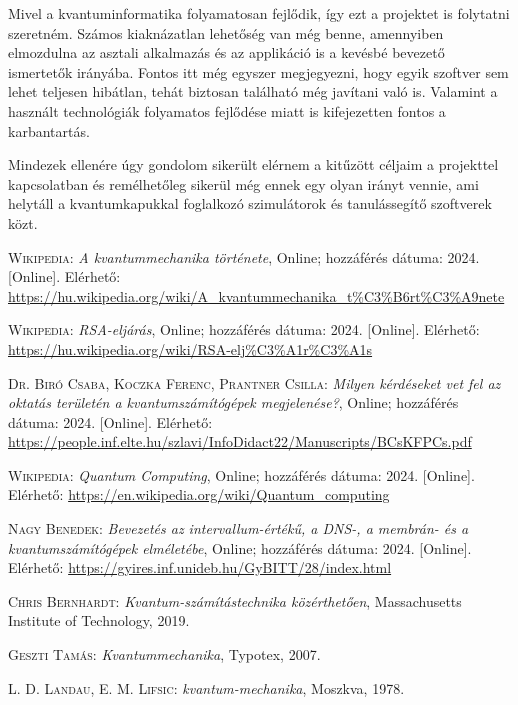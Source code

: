 \documentclass[
]{thesis-ekf}
\theoremstyle{definition}
\theoremstyle{remark}
\begin{document}
Mivel a kvantuminformatika folyamatosan fejlődik, így ezt a projektet is folytatni szeretném. Számos kiaknázatlan lehetőség van még benne, amennyiben elmozdulna az asztali alkalmazás és az applikáció is a kevésbé bevezető ismertetők irányába. Fontos itt még egyszer megjegyezni, hogy egyik szoftver sem lehet teljesen hibátlan, tehát biztosan található még javítani való is. Valamint a használt technológiák folyamatos fejlődése miatt is kifejezetten fontos a karbantartás.

Mindezek ellenére úgy gondolom sikerült elérnem a kitűzött céljaim a projekttel kapcsolatban és remélhetőleg sikerül még ennek egy olyan irányt vennie, ami helytáll a kvantumkapukkal foglalkozó szimulátorok és tanulássegítő szoftverek közt.


\begin{thebibliography}{2}

\textsc{Wikipedia}: \emph{A kvantummechanika története}, Online; hozzáférés dátuma: 2024. [Online]. Elérhető: \url{https://hu.wikipedia.org/wiki/A_kvantummechanika_t%C3%B6rt%C3%A9nete}

\textsc{Wikipedia}: \emph{RSA-eljárás}, Online; hozzáférés dátuma: 2024. [Online]. Elérhető: \url{https://hu.wikipedia.org/wiki/RSA-elj%C3%A1r%C3%A1s}

\textsc{Dr. Biró Csaba, Koczka Ferenc, Prantner Csilla}: \emph{Milyen kérdéseket vet fel az oktatás területén a
	kvantumszámítógépek megjelenése?}, Online; hozzáférés dátuma: 2024. [Online]. Elérhető: \url{https://people.inf.elte.hu/szlavi/InfoDidact22/Manuscripts/BCsKFPCs.pdf}
	
\textsc{Wikipedia}: \emph{Quantum Computing}, Online; hozzáférés dátuma: 2024. [Online]. Elérhető: \url{https://en.wikipedia.org/wiki/Quantum_computing}

\textsc{Nagy Benedek}: \emph{Bevezetés az intervallum-értékű, a DNS-, a membrán- és a kvantumszámítógépek elméletébe}, Online; hozzáférés dátuma: 2024. [Online]. Elérhető: \url{https://gyires.inf.unideb.hu/GyBITT/28/index.html}

\textsc{Chris Bernhardt}: \emph{Kvantum-számítástechnika közérthetően}, Massachusetts Institute of Technology, 2019.

\textsc{Geszti Tamás}: \emph{Kvantummechanika}, Typotex, 2007.

\textsc{L. D. Landau, E. M. Lifsic}: \emph{kvantum-mechanika}, Moszkva, 1978.


\end{thebibliography}
\end{document}
